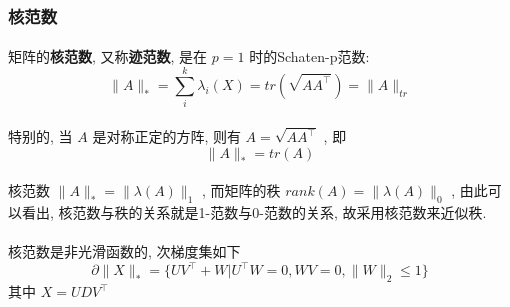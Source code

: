 \documentclass[UTF8]{ctexart}
\begin{document}
			\subsubsection{核范数}
				\paragraph{}
					\quad 矩阵的\textbf{核范数}, 又称\textbf{迹范数}, 是在 $p = 1$ 时的Schaten-p范数:
					\[
							\lVert{A}\rVert_*
						=	\sum_i^k \lambda_i(X)
						=	tr(\sqrt{A A^\top})
						=	\lVert{A}\rVert_{tr}
					\]

				\paragraph{}
					\quad 特别的, 当 $A$ 是对称正定的方阵, 则有 $ A = \sqrt{A A^\top}$ , 即
					\[
						\lVert{A}\rVert_* = tr(A)
					\]

				\paragraph{}
					\quad 核范数 $\lVert{A}\rVert_* = \lVert{\lambda(A)}\rVert_1$ , 而矩阵的秩 $rank(A) = \lVert{\lambda(A)}\rVert_0$ , 由此可以看出, 核范数与秩的关系就是1-范数与0-范数的关系, 故采用核范数来近似秩.

				\paragraph{}
					\quad 核范数是非光滑函数的, 次梯度集如下
					\begin{equation}\label{NuNormSubGrad}
							\partial \lVert{X}\rVert_*
						=	\{U V^\top + W \vert U^\top W = 0,WV = 0, \lVert{W}\rVert_2 \leq 1\}
					\end{equation}
					其中 $X = U D V^\top$
\end{document}
